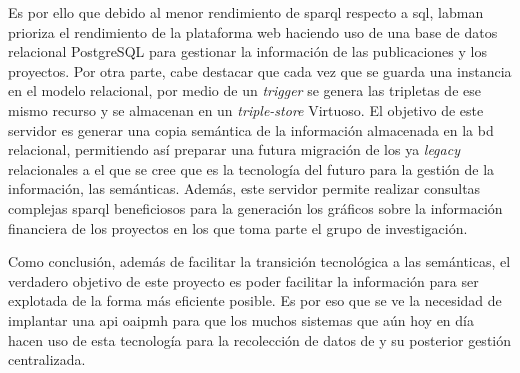 Es por ello que debido al menor rendimiento de \acrshort{sparql} respecto a \acrshort{sql}, \acrshort{labman} prioriza el rendimiento de la plataforma web haciendo uso de una base de datos relacional PostgreSQL\cite{PostgreSQL} para gestionar la información de las publicaciones y los proyectos. Por otra parte, cabe destacar que cada vez que se guarda una instancia en el modelo relacional, por medio de un \textit{trigger} se genera las tripletas de ese mismo recurso y se almacenan en un \textit{triple-store} Virtuoso\cite{Virtuoso}. El objetivo de este servidor es generar una copia semántica de la información almacenada en la \acrshort{bd} relacional, permitiendo así preparar una futura migración  de los ya \textit{legacy}  relacionales a el que se cree que es la tecnología del futuro para la gestión de la información, las  semánticas. Además, este servidor permite realizar consultas complejas \acrshort{sparql} beneficiosos para la generación los gráficos sobre la información financiera de los proyectos en los que toma parte el grupo de investigación.

 Como conclusión, además de facilitar la transición tecnológica a las  semánticas, el verdadero objetivo de este proyecto es poder facilitar la información para ser explotada de la forma más eficiente posible. Es por eso que se ve la necesidad de implantar una \acrfull{api} \acrshort{oaipmh} para que los muchos sistemas que aún hoy en día hacen uso de esta tecnología para la recolección de datos de y su posterior gestión centralizada.